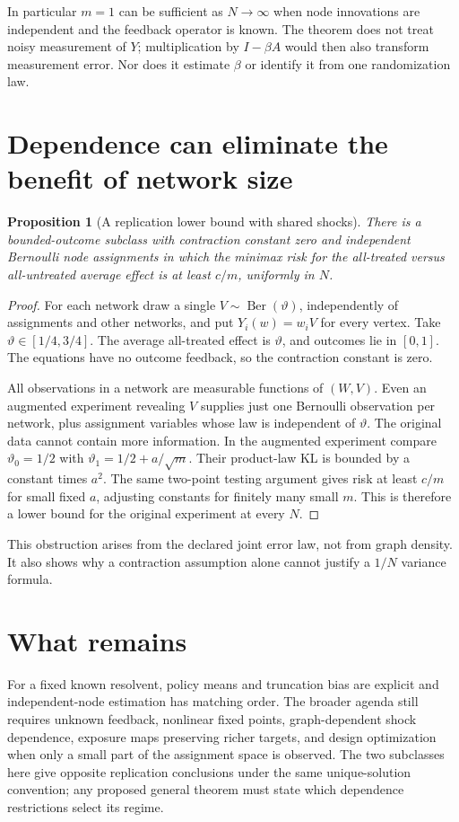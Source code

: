 \documentclass[11pt,a4paper]{article}
\newtheorem{proposition}[theorem]{Proposition}
\theoremstyle{remark}
\begin{document}
In particular $m=1$ can be sufficient as $N\to\infty$ when node innovations are independent and the feedback operator is known. The theorem does not treat noisy measurement of $Y$; multiplication by $I-\beta A$ would then also transform measurement error. Nor does it estimate $\beta$ or identify it from one randomization law.

\section{Dependence can eliminate the benefit of network size}
\begin{proposition}[A replication lower bound with shared shocks]
There is a bounded-outcome subclass with contraction constant zero and independent Bernoulli node assignments in which the minimax risk for the all-treated versus all-untreated average effect is at least $c/m$, uniformly in $N$.
\end{proposition}
\begin{proof}
For each network draw a single $V\sim\operatorname{Ber}(\vartheta)$, independently of assignments and other networks, and put $Y_i(w)=w_iV$ for every vertex. Take $\vartheta\in[1/4,3/4]$. The average all-treated effect is $\vartheta$, and outcomes lie in $[0,1]$. The equations have no outcome feedback, so the contraction constant is zero.

All observations in a network are measurable functions of $(W,V)$. Even an augmented experiment revealing $V$ supplies just one Bernoulli observation per network, plus assignment variables whose law is independent of $\vartheta$. The original data cannot contain more information. In the augmented experiment compare $\vartheta_0=1/2$ with $\vartheta_1=1/2+a/\sqrt m$. Their product-law KL is bounded by a constant times $a^2$. The same two-point testing argument gives risk at least $c/m$ for small fixed $a$, adjusting constants for finitely many small $m$. This is therefore a lower bound for the original experiment at every $N$.
\end{proof}

This obstruction arises from the declared joint error law, not from graph density. It also shows why a contraction assumption alone cannot justify a $1/N$ variance formula.

\section{What remains}
For a fixed known resolvent, policy means and truncation bias are explicit and independent-node estimation has matching order. The broader agenda still requires unknown feedback, nonlinear fixed points, graph-dependent shock dependence, exposure maps preserving richer targets, and design optimization when only a small part of the assignment space is observed. The two subclasses here give opposite replication conclusions under the same unique-solution convention; any proposed general theorem must state which dependence restrictions select its regime.
\end{document}

